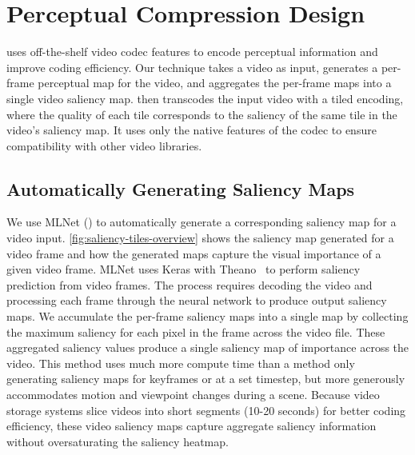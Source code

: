 \section{\name Perceptual Compression Design}
\label{sec:tiled-compression}

\nameCompress uses off-the-shelf video codec features to encode perceptual information and improve coding efficiency.
Our technique takes a video as input, generates a per-frame perceptual map for the video, and aggregates the per-frame maps into a single video saliency map.
\nameCompress then transcodes the input video with a tiled encoding, where the quality of each tile corresponds to the saliency of the same tile in the video's saliency map.
It uses only the native features of the \hevc codec to ensure compatibility with other video libraries.

\subsection{Automatically Generating Saliency Maps}
\label{subsec:supersal}

We use MLNet (\cite{mlnet2016}) to automatically generate a corresponding saliency map for a video input.
\ref{fig:saliency-tiles-overview} shows the saliency map generated for a video frame and how the generated maps capture the visual importance of a given video frame.
MLNet uses Keras with Theano~\cite{chollet2015keras, theano} to perform saliency prediction from video frames.
The process requires decoding the video and processing each frame through the neural network to produce output saliency maps.
We accumulate the per-frame saliency maps into a single map by collecting the maximum saliency for each pixel in the frame across the video file.
These aggregated saliency values produce a single saliency map of importance across the video.
This method uses much more compute time than a method only generating saliency maps for keyframes or at a set timestep, but more generously accommodates motion and viewpoint changes during a scene.
Because video storage systems slice videos into short segments (10-20 seconds) for better coding efficiency, these video saliency maps capture aggregate saliency information without oversaturating the saliency heatmap.

